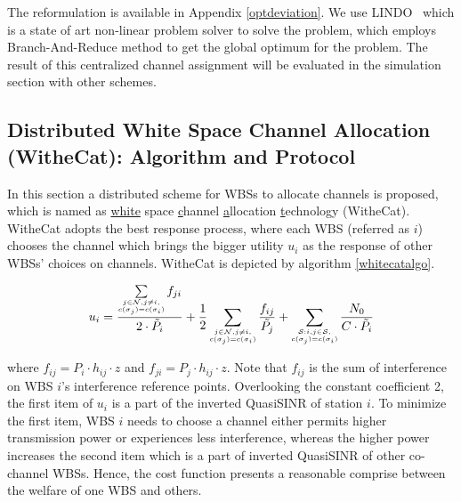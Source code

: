 The reformulation is available in Appendix \ref{optdeviation}.
We use LINDO~\cite{lindo} which is a state of art non-linear problem solver to solve the problem, which employs Branch-And-Reduce method to get the global optimum for the problem. %
The result of this centralized channel assignment will be evaluated in the simulation section with other schemes. 



\subsection{Distributed White Space Channel Allocation (WitheCat): Algorithm and Protocol}
\label{whitecat}
In this section a distributed scheme for WBSs to allocate channels is proposed, which is named as \underline{white} space \underline{c}hannel \underline{a}llocation \underline{t}echnology (WitheCat). 
WitheCat adopts the best response process, where each WBS (referred as $i$) chooses the channel which brings the bigger utility $u_i$ as the response of other WBSs' choices on channels.
WitheCat is depicted by algorithm \ref{whitecatalgo}.

\begin{equation}
\label{utility}
u_i =\dfrac{\sum\limits_{\tiny\substack{j\in \mathcal{N}, j\ne i,\\ c(\sigma_j)=c(\sigma_i)}}f_{ji}}{2\cdot \tilde{P_i}} + \dfrac{1}{2}\sum_{\tiny\substack{j\in \mathcal{N}, j\ne i,\\ c(\sigma_j)=c(\sigma_i)}}\dfrac{f_{ij}}{\tilde{P_j}} + \sum_{\tiny\substack{\mathcal{S}:i,j\in \mathcal{S},\\ c(\sigma_j)=c(\sigma_i)}}\dfrac{N_0}{C\cdot \tilde{P_i}}\\
\end{equation}

where $f_{ij}= P_i\cdot h_{ij}\cdot z$ and $f_{ji}= P_j\cdot h_{ij}\cdot z$.
Note that $f_{ij}$ is the sum of interference on WBS $i$'s interference reference points.
Overlooking the constant coefficient 2, the first item of $u_i$ is a part of the inverted QuasiSINR of station $i$. 
To minimize the first item, WBS $i$ needs to choose a channel either permits higher transmission power or experiences less interference, whereas the higher power increases the second item which is a part of inverted QuasiSINR of other co-channel WBSs. 
Hence, the cost function presents a reasonable comprise between the welfare of one WBS and others.

